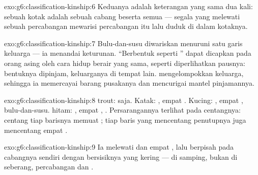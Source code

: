 \begin{solution}{exo:g6:classification-kinship:6}
Keduanya adalah keterangan yang sama dua kali: sebuah kotak adalah
sebuah cabang beserta semua  --- segala yang melewati sebuah
percabangan mewarisi  percabangan itu lalu duduk di dalam
kotaknya.
\end{solution}

\begin{solution}{exo:g6:classification-kinship:7}
Bulu-dan-susu diwariskan menuruni satu garis keluarga --- ia menandai
keturunan. ``Berbentuk seperti '' dapat dicapkan pada orang asing
oleh cara hidup berair yang sama, seperti diperlihatkan pausnya:
bentuknya dipinjam, keluarganya di tempat lain. 
mengelompokkan keluarga, sehingga ia memercayai barang pusakanya dan
mencurigai mantel pinjamannya.
\end{solution}

\begin{solution}{exo:g6:classification-kinship:8}
 trout:  saja. Katak: , empat
. Kucing: , empat ,
bulu-dan-susu.  hitam: , empat ,
. Persarangannya terlihat pada centangnya: centang tiap
barisnya memuat ; tiap baris yang mencentang penutupnya
juga mencentang empat .
\end{solution}

\begin{solution}{exo:g6:classification-kinship:9}
Ia melewati  dan empat , lalu berpisah
pada cabangnya sendiri dengan  bersisiknya yang kering --- di
samping, bukan di seberang, percabangan  dan .
\end{solution}


